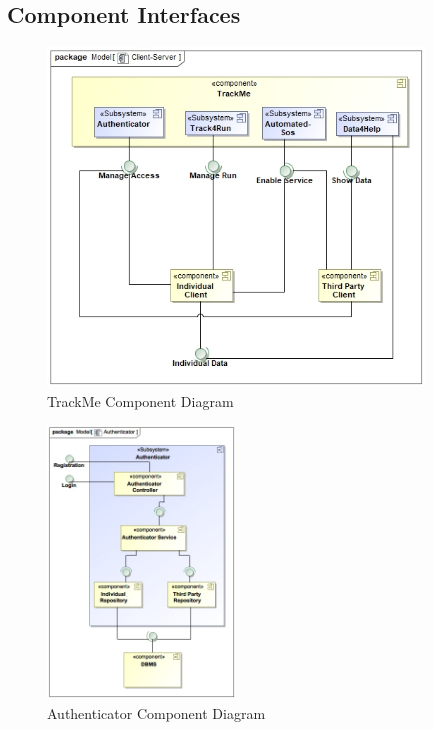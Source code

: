 \documentclass[a4paper]{article}
\begin{document}
\subsection{Component Interfaces}
\begin{figure}[!htpb]
    \centering
    \includegraphics[width=100mm,keepaspectratio]{images/UML/component_TrackMe.jpg}
    \caption{TrackMe Component Diagram}
    \label{fig:component_trackme}
\end{figure}
\begin{figure}[!htpb]
    \centering
    \includegraphics[width=50mm,keepaspectratio]{DD/images/UML/component_Authenticator.jpg}
    \caption{Authenticator Component Diagram}
    \label{fig:component_authenticator}
\end{figure}
\end{document}
